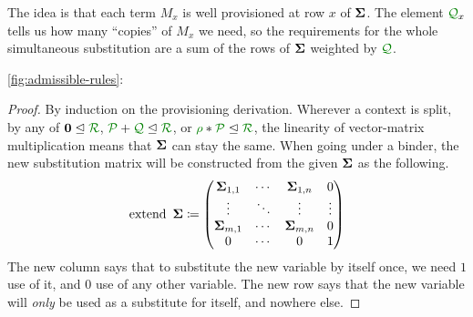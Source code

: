 The idea is that each term $M_x$ is well provisioned at row $x$ of $\mathbf{\Sigma}$.
The element $\resctx Q_x$ tells us how many ``copies'' of $M_x$ we need, so the
requirements for the whole simultaneous substitution are a sum of the rows of
$\mathbf{\Sigma}$ weighted by $\resctx Q$.

\begin{lemma}[Substitution]
  \autoref{fig:admissible-rules}: 
\end{lemma}
\renewcommand{\proofname}{Proof sketch}
\begin{proof}
  By induction on the provisioning derivation.
  Wherever a context is split, by any of $\vct 0 \subres \resctx R$,
  $\resctx P + \resctx Q \subres \resctx R$, or
  $\rescomment \rho * \resctx P \subres \resctx R$, the linearity of vector-matrix
  multiplication means that $\mathbf{\Sigma}$ can stay the same.
  When going under a binder, the new substitution matrix will be constructed
  from the given $\mathbf{\Sigma}$ as the following.
  \newcommand*{\mathhuge}[1]{\mathlarger{\mathlarger{\mathlarger{\mathlarger{#1}}}}}
  \[
    \operatorname{extend}~\mathbf{\Sigma} \coloneqq
    \begin{pmatrix}
      \mathbf{\Sigma}_{1,1} & \cdots & \mathbf{\Sigma}_{1,n} & 0 \\
      \vdots & \ddots & \vdots & \vdots \\
      \mathbf{\Sigma}_{m,1} & \cdots & \mathbf{\Sigma}_{m,n} & 0 \\
      0 & \cdots & 0 & 1
    \end{pmatrix}
  \]
  The new column says that to substitute the new variable by itself once, we
  need $1$ use of it, and $0$ use of any other variable.
  The new row says that the new variable will \emph{only} be used as a
  substitute for itself, and nowhere else.
\end{proof}
\renewcommand{\proofname}{Proof}

